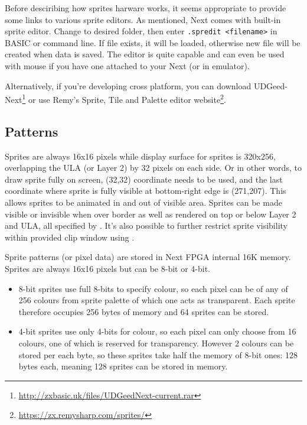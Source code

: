 \documentclass[12pt,twoside,openright,a4paper]{book}
\begin{document}
Before desciribing how sprites harware works, it seems appropriate to provide some links to various sprite editors. As mentioned, Next comes with built-in sprite editor. Change to desired folder, then enter {\tt .spredit <filename>} in BASIC or command line. If file exists, it will be loaded, otherwise new file will be created when data is saved. The editor is quite capable and can even be used with mouse if you have one attached to your Next (or in emulator).

Alternatively, if you're developing cross platform, you can download UDGeed-Next\footnote{\url{http://zxbasic.uk/files/UDGeedNext-current.rar}} or use Remy's Sprite, Tile and Palette editor website\footnote{\url{https://zx.remysharp.com/sprites/}}.


\subsection{Patterns}

Sprites are always 16x16 pixels while display surface for sprites is 320x256, overlapping the ULA (or Layer 2) by 32 pixels on each side. Or in other words, to draw sprite fully on screen, (32,32) coordinate needs to be used, and the last coordinate where sprite is fully visible at bottom-right edge is (271,207). This allows sprites to be animated in and out of visible area. Sprites can be made visible or invisible when over border as well as rendered on top or below Layer 2 and ULA, all specified by . It's also possible to further restrict sprite visibility within provided clip window using .

Sprite patterns (or pixel data) are stored in Next FPGA internal 16K memory. Sprites are always 16x16 pixels but can be 8-bit or 4-bit.

\begin{itemize}[topsep=1pt,itemsep=1pt]
	\item 8-bit sprites use full 8-bits to specify colour, so each pixel can be of any of 256 colours from sprite palette of which one acts as transparent. Each sprite therefore occupies 256 bytes of memory and 64 sprites can be stored.

	\item 4-bit sprites use only 4-bits for colour, so each pixel can only choose from 16 colours, one of which is reserved for transparency. However 2 colours can be stored per each byte, so these sprites take half the memory of 8-bit ones: 128 bytes each, meaning 128 sprites can be stored in memory.
\end{itemize}
\end{document}
